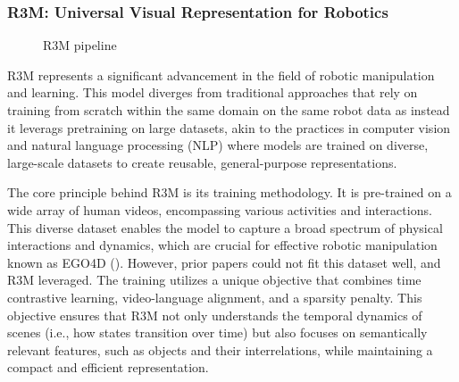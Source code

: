\documentclass[
  letterpaper,
  numbers=noenddot,
  DIV=11]{scrreprt}
\theoremstyle{definition}
\theoremstyle{plain}
\theoremstyle{plain}
\theoremstyle{remark}
\begin{document}
\subsubsection*{R3M: Universal Visual Representation for
Robotics}\label{r3m-universal-visual-representation-for-robotics}

\begin{figure}


\caption{\label{fig-r3m-pipline}R3M pipeline}

\end{figure}%

R3M represents a significant advancement in the field of robotic
manipulation and learning. This model diverges from traditional
approaches that rely on training from scratch within the same domain on
the same robot data as instead it leverags pretraining on large
datasets, akin to the practices in computer vision and natural language
processing (NLP) where models are trained on diverse, large-scale
datasets to create reusable, general-purpose representations.

The core principle behind R3M is its training methodology. It is
pre-trained on a wide array of human videos, encompassing various
activities and interactions. This diverse dataset enables the model to
capture a broad spectrum of physical interactions and dynamics, which
are crucial for effective robotic manipulation known as EGO4D
(). However, prior
papers could not fit this dataset well, and R3M leveraged. The training
utilizes a unique objective that combines time contrastive learning,
video-language alignment, and a sparsity penalty. This objective ensures
that R3M not only understands the temporal dynamics of scenes (i.e., how
states transition over time) but also focuses on semantically relevant
features, such as objects and their interrelations, while maintaining a
compact and efficient representation.
\end{document}
